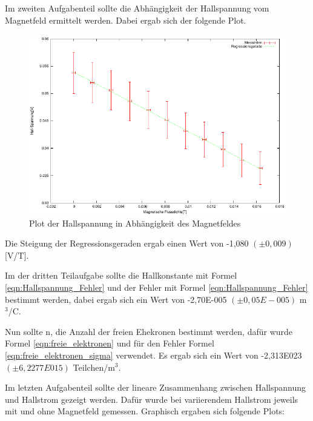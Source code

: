 \documentclass[12pt]{scrartcl}
\begin{document}
Im zweiten Aufgabenteil sollte die Abhängigkeit der Hallspannung vom Magnetfeld ermittelt werden. Dabei ergab sich der folgende Plot.

\begin{figure}[htbp] 
  \centering
    \includegraphics[scale = 1.3]{aufgabe_3_b.pdf}
  	\caption[Plot der Hallspannung in Abhängigkeit des Magnetfeldes]{Plot der Hallspannung in Abhängigkeit des Magnetfeldes}
  \label{fig:hall_mag}
\end{figure}

Die Steigung der Regressionsgeraden ergab einen Wert von -1,080	$(\pm 0,009)$ [V/T].

Im der dritten Teilaufgabe sollte die Hallkonstante mit Formel \ref{eqn:Hallspannung_Fehler} und der Fehler mit Formel \ref{eqn:Hallspannung_Fehler} bestimmt werden, dabei ergab sich ein Wert von -2,70E-005 $(\pm 0,05E-005)$ m$^3$/C.

Nun sollte n, die Anzahl der freien Ehekronen bestimmt werden, dafür wurde Formel \ref{eqn:freie_elektronen} und für den Fehler Formel \ref{eqn:freie_elektronen_sigma} verwendet. Es ergab sich ein Wert von -2,313E023 $(\pm 6,2277E015)$ Teilchen/m$^3$.

Im letzten Aufgabenteil sollte der lineare Zusammenhang zwischen Hallspannung und Hallstrom gezeigt werden. Dafür wurde bei variierendem Hallstrom jeweils mit und ohne Magnetfeld gemessen.
Graphisch ergaben sich folgende Plots:
\end{document}
